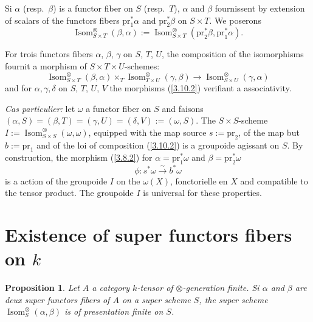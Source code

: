 \documentclass[11pt,a4paper]{article}
\theoremstyle{plain}
\newtheorem{proposition}[theorem]{Proposition}
\theoremstyle{definition}
\newcommand{\pr}{\mathrm{pr}}
\newcommand{\Isom}{\operatorname{Isom}}
\begin{document}
Si $\alpha$ (resp.~$\beta$) is a functor fiber on $S$ (resp.~$T$), $\alpha$ and $\beta$ fournissent by extension of scalars of the functors fibers $\pr_1^*\alpha$ and $\pr_2^*\beta$ on $S\times T$. We poserons
\begin{equation}\label{3.10.1}
\Isom^\otimes_{S\times T}(\beta,\alpha):=\Isom^\otimes_{S\times T}(\pr_2^*\beta,\pr_1^*\alpha).
\end{equation}

For trois functors fibers $\alpha$, $\beta$, $\gamma$ on $S$, $T$, $U$, the composition of the isomorphisms fournit a morphism of $S\times T\times U$-schemes:
\begin{equation}\label{3.10.2}
\Isom^\otimes_{S\times T}(\beta,\alpha)\times_T\Isom^\otimes_{T\times U}(\gamma,\beta)\longrightarrow\Isom^\otimes_{S\times U}(\gamma,\alpha)
\end{equation}
and for $\alpha,\gamma,\delta$ on $S$, $T$, $U$, $V$ the morphisms (\ref{3.10.2}) verifiant a associativity.

\emph{Cas particulier:} let $\omega$ a functor fiber on $S$ and faisons $(\alpha,S)=(\beta,T)=(\gamma,U)=(\delta,V):=(\omega,S)$. The $S\times S$-scheme $I:=\Isom^\otimes_{S\times S}(\omega,\omega)$, equipped with the map source $s:=\pr_2$, of the map but $b:=\pr_1$ and of the loi of composition (\ref{3.10.2}) is a groupoide agissant on $S$. By construction, the morphism (\ref{3.8.2}) for $\alpha=\pr_1^*\omega$ and $\beta=\pr_2^*\omega$
\[
\phi:s^*\omega\xrightarrow{\sim}b^*\omega
\]
is a action of the groupoide $I$ on the $\omega(X)$, fonctorielle en $X$ and compatible to the tensor product. The groupoide $I$ is universal for these properties.

\section{Existence of super functors fibers on $k$}\label{4}

\begin{proposition}\label{4.1}
Let $A$ a category $k$-tensor of $\otimes$-generation finite. Si $\alpha$ and $\beta$ are deux super functors fibers of $A$ on a super scheme $S$, the super scheme $\Isom^\otimes_S(\alpha,\beta)$ is of presentation finite on $S$.
\end{proposition}
\end{document}
